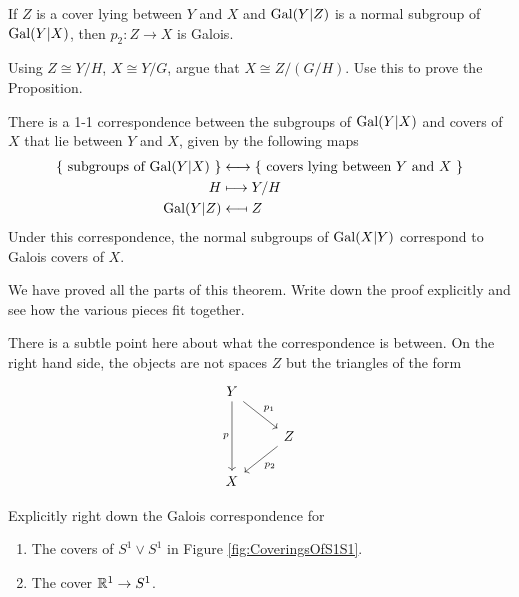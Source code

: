\begin{proposition}
  If $Z$ is a cover lying between $Y$ and $X$ and $\operatorname{Gal}(Y|Z)$ is a normal subgroup of $\operatorname{Gal}(Y|X)$, then $p_2:Z \rightarrow X$ is Galois.
\end{proposition}
  \begin{qbox}
    Using $Z \cong Y/H$, $X \cong Y/G$, argue that $X \cong Z/(G/H)$. Use this to prove the Proposition.
  \end{qbox}





\begin{theorem}
  There is a 1-1 correspondence between the subgroups of $\operatorname{Gal}(Y|X)$ and covers of $X$ that lie between $Y$ and $X$, given by the following maps
  \begin{align*}
    \{\mbox{ subgroups of $\operatorname{Gal}(Y|X)$ } \} &\longleftrightarrow  \{\mbox{ covers lying between $Y$ and $X$ } \}\\
    H &\longmapsto Y/H \\
    \operatorname{Gal}(Y|Z) & \longmapsfrom Z
  \end{align*}
  Under this correspondence, the normal subgroups of $\operatorname{Gal}(X|Y)$ correspond to Galois covers of $X$.
\end{theorem}
\begin{qbox}
  We have proved all the parts of this theorem. Write down the proof explicitly and see how the various pieces fit together.
\end{qbox}

\begin{remark}
  There is a subtle point here about what the correspondence is between. On the right hand side, the objects are not spaces $Z$ but the triangles of the form \begin{equation*}
    \begin{tikzcd}
      Y \ar[rd, "p_1"] \ar[dd, "p"']\\
        & Z \ar[ld,"p_2"] \\
      X
    \end{tikzcd}
  \end{equation*}
\end{remark}


\begin{qbox}
  Explicitly right down the Galois correspondence for
  \begin{enumerate}
    \item The covers of $S^1 \vee S^1$ in Figure \ref{fig:CoveringsOfS1S1}.
    \item The cover $\mathbb{R}^1 \rightarrow S^1$.
  \end{enumerate}
\end{qbox}










